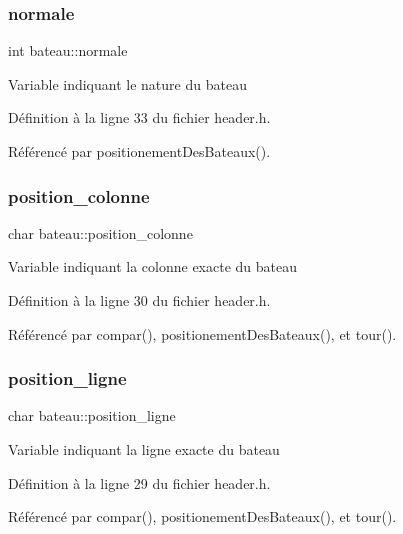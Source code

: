 \subsubsection{\texorpdfstring{normale}{normale}}
{\footnotesize\ttfamily int bateau\+::normale}

Variable indiquant le nature du bateau 

Définition à la ligne 33 du fichier header.\+h.



Référencé par positionement\+Des\+Bateaux().

\mbox{\label{structbateau_aac775edde7cde57176e580c29f6e8eca}} 
\subsubsection{\texorpdfstring{position\+\_\+colonne}{position\_colonne}}
{\footnotesize\ttfamily char bateau\+::position\+\_\+colonne}

Variable indiquant la colonne exacte du bateau 

Définition à la ligne 30 du fichier header.\+h.



Référencé par compar(), positionement\+Des\+Bateaux(), et tour().

\mbox{\label{structbateau_a5dcd33e534b9b1b8b0414325bc5c09b1}} 
\subsubsection{\texorpdfstring{position\+\_\+ligne}{position\_ligne}}
{\footnotesize\ttfamily char bateau\+::position\+\_\+ligne}

Variable indiquant la ligne exacte du bateau 

Définition à la ligne 29 du fichier header.\+h.



Référencé par compar(), positionement\+Des\+Bateaux(), et tour().

\mbox{\label{structbateau_ac4078d21fa180ff7d5c7e7fbf8a4a773}} 
